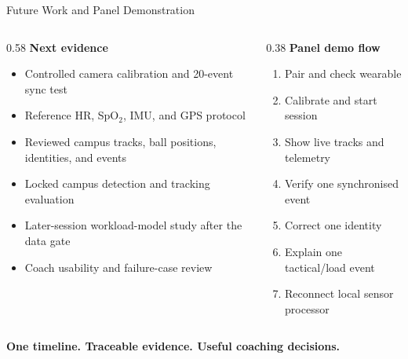 \documentclass[aspectratio=169,10pt]{beamer}
\begin{document}
\begin{frame}{Future Work and Panel Demonstration}
\begin{columns}[T,onlytextwidth]
\begin{column}{0.58\textwidth}
\small
\textbf{Next evidence}
\begin{itemize}
  \item Controlled camera calibration and 20-event sync test
  \item Reference HR, SpO$_2$, IMU, and GPS protocol
  \item Reviewed campus tracks, ball positions, identities, and events
  \item Locked campus detection and tracking evaluation
  \item Later-session workload-model study after the data gate
  \item Coach usability and failure-case review
\end{itemize}
\end{column}
\begin{column}{0.38\textwidth}
\textbf{Panel demo flow}
\begin{enumerate}
  \item Pair and check wearable
  \item Calibrate and start session
  \item Show live tracks and telemetry
  \item Verify one synchronised event
  \item Correct one identity
  \item Explain one tactical/load event
  \item Reconnect local sensor processor
\end{enumerate}
\end{column}
\end{columns}
\vfill
{\Large\bfseries\color{tietmaroon} One timeline. Traceable evidence. Useful coaching decisions.}
\end{frame}
\end{document}
